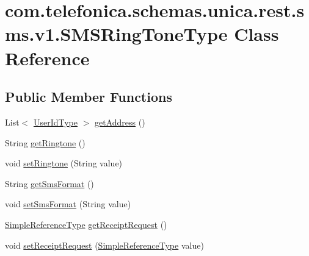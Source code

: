 \hypertarget{classcom_1_1telefonica_1_1schemas_1_1unica_1_1rest_1_1sms_1_1v1_1_1SMSRingToneType}{
\section{com.telefonica.schemas.unica.rest.sms.v1.SMSRingToneType Class Reference}
\label{classcom_1_1telefonica_1_1schemas_1_1unica_1_1rest_1_1sms_1_1v1_1_1SMSRingToneType}
}
\subsection*{Public Member Functions}
\begin{DoxyCompactItemize}
\item 
List$<$ \hyperlink{classcom_1_1telefonica_1_1schemas_1_1unica_1_1rest_1_1common_1_1v1_1_1UserIdType}{UserIdType} $>$ \hyperlink{classcom_1_1telefonica_1_1schemas_1_1unica_1_1rest_1_1sms_1_1v1_1_1SMSRingToneType_ab687379c3539fba81fe86494c3cb95d8}{getAddress} ()
\item 
String \hyperlink{classcom_1_1telefonica_1_1schemas_1_1unica_1_1rest_1_1sms_1_1v1_1_1SMSRingToneType_a0f9655f8e0e103233c3d997ea978a4b8}{getRingtone} ()
\item 
void \hyperlink{classcom_1_1telefonica_1_1schemas_1_1unica_1_1rest_1_1sms_1_1v1_1_1SMSRingToneType_a2249e60248f3bc8b697954539b300f2e}{setRingtone} (String value)
\item 
String \hyperlink{classcom_1_1telefonica_1_1schemas_1_1unica_1_1rest_1_1sms_1_1v1_1_1SMSRingToneType_a2577458eb2da44542b9cb30778762590}{getSmsFormat} ()
\item 
void \hyperlink{classcom_1_1telefonica_1_1schemas_1_1unica_1_1rest_1_1sms_1_1v1_1_1SMSRingToneType_a8ff4aec245dad8433be8a5108f72e6d3}{setSmsFormat} (String value)
\item 
\hyperlink{classcom_1_1telefonica_1_1schemas_1_1unica_1_1rest_1_1common_1_1v1_1_1SimpleReferenceType}{SimpleReferenceType} \hyperlink{classcom_1_1telefonica_1_1schemas_1_1unica_1_1rest_1_1sms_1_1v1_1_1SMSRingToneType_a58f866b101af2c307930e1c055df1f75}{getReceiptRequest} ()
\item 
void \hyperlink{classcom_1_1telefonica_1_1schemas_1_1unica_1_1rest_1_1sms_1_1v1_1_1SMSRingToneType_a5adc17bdada4f73f2c88aa14070f9200}{setReceiptRequest} (\hyperlink{classcom_1_1telefonica_1_1schemas_1_1unica_1_1rest_1_1common_1_1v1_1_1SimpleReferenceType}{SimpleReferenceType} value)

\end{DoxyCompactItemize}
